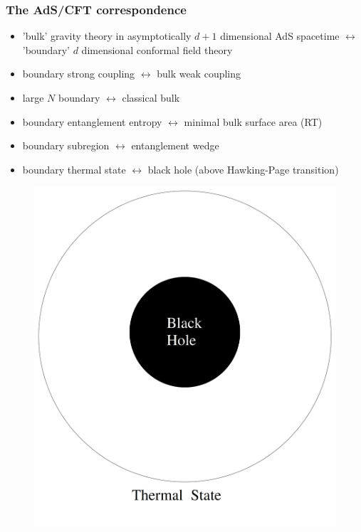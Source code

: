 \documentclass[10pt,aspectratio=169]{beamer}
\begin{document}
\begin{frame}
\frametitle{The AdS/CFT correspondence}

\begin{minipage}[t]{0.48\linewidth}

\begin{itemize}

\item 'bulk' gravity theory in asymptotically $d+1$ dimensional AdS spacetime $\leftrightarrow$ 'boundary' $d$ dimensional conformal field theory

\item boundary strong coupling $\leftrightarrow$ bulk weak coupling

\item large $N$ boundary $\leftrightarrow$ classical bulk

\item boundary entanglement entropy $\leftrightarrow$ minimal bulk surface area (RT)

\item boundary subregion $\leftrightarrow$ entanglement wedge

\item boundary thermal state $\leftrightarrow$ black hole (above Hawking-Page transition)

\end{itemize}

\end{minipage}
%
\hfill
%
\begin{minipage}[t]{0.48\linewidth}

\begin{figure}
    \begin{center}
    
        \includegraphics[scale=0.06]{adscft6}    
    

\end{center}
\end{figure}
\end{minipage}
\end{frame}
\end{document}
